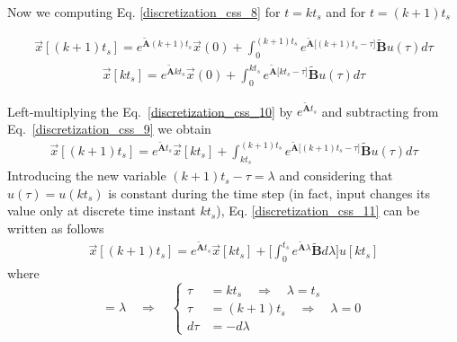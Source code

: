\documentclass[11pt,a4paper,oneside]{book}
\numberwithin{equation}{section}
\theoremstyle{it}
\theoremstyle{definition}
\begin{document}
Now we computing Eq. \ref{discretization_css_8} for $t=kt_s$ and for 
$t=(k+1)t_s$
\begin{mybox}
\begin{equation}\label{discretization_css_9}
	\begin{aligned}
		\vec{x}[(k+1)t_s] = e^{\tilde{\mathbf{A}}(k+1)t_s} \vec{x}(0) + \int_{0}^{(k+1)t_s} e^{\tilde{\mathbf{A}}\Big[(k+1)t_s-\tau\Big]} \tilde{\mathbf{B}}u(\tau)d\tau
	\end{aligned}
\end{equation}
\begin{equation}\label{discretization_css_10}
	\begin{aligned}
		\vec{x}[kt_s] = e^{\tilde{\mathbf{A}}kt_s} \vec{x}(0) + \int_{0}^{kt_s}e^{\tilde{\mathbf{A}}\Big[kt_s-\tau\Big]} \tilde{\mathbf{B}}u(\tau)d\tau
	\end{aligned}
\end{equation}
\end{mybox}
Left-multiplying the Eq.~\eqref{discretization_css_10} by 
$e^{\tilde{\mathbf{A}}t_s}$ and subtracting from 
Eq.~\eqref{discretization_css_9} we obtain 
\begin{equation}\label{discretization_css_11}
	\begin{aligned}
		\vec{x}[(k+1)t_s] = e^{\tilde{\mathbf{A}}t_s} \vec{x}[kt_s] + \int_{kt_s}^{(k+1)t_s} e^{\tilde{\mathbf{A}}\Big[(k+1)t_s-\tau\Big]} \tilde{\mathbf{B}}u(\tau)d\tau
	\end{aligned}
\end{equation}
Introducing the new variable $ (k+1)t_s-\tau = \lambda $ and considering that 
$u(\tau) = u(kt_s)$ is constant during the time step (in fact, input changes 
its value only at discrete time instant $kt_s$), Eq. 
\ref{discretization_css_11} can be written as follows
\begin{equation}\label{discretization_css_12}
	\begin{aligned}
		\vec{x}[(k+1)t_s] = e^{\tilde{\mathbf{A}}t_s} \vec{x}[kt_s] + 
		\Bigg[\int_{0}^{t_s}e^{\tilde{\mathbf{A}}\lambda} 
		\tilde{\mathbf{B}}d\lambda\Bigg] u[kt_s]
	\end{aligned}
\end{equation}
where 
\begin{equation}
	[(k+1)t_s-\tau]= \lambda \quad\Rightarrow\quad\left\lbrace 
	\begin{aligned}
		\tau &= kt_s \quad\Rightarrow\quad \lambda = t_s \\[6pt]
		\tau &= (k+1)t_s \quad\Rightarrow\quad \lambda = 0 \\[6pt]
		d\tau &= -d\lambda
	\end{aligned}\right. 
\end{equation}
\end{document}
